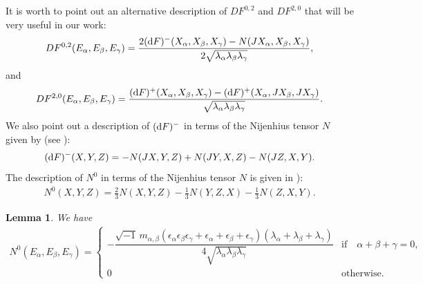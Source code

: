 \documentclass[10pt,a4paper]{amsart}
\numberwithin{equation}{section}
\newtheorem{Lemma}[Theorem]{Lemma}
\begin{document}
\begin{Remark}
It is worth to point out an alternative description of $DF^{0,2}$ and $DF^{2,0}$ that will be very useful in our work:
\begin{gather*}
DF^{0,2}(E_{\alpha},E_{\beta},E_{\gamma})=\dfrac{2({\rm d}F)^{-}(X_{\alpha},X_{\beta},X_{\gamma}) -N(JX_{\alpha},X_{\beta},X_{\gamma})}{2\sqrt{\lambda_{\alpha}\lambda_{\beta}\lambda_{\gamma}}},
\end{gather*}
and
\begin{gather*}
DF^{2,0}(E_{\alpha},E_{\beta},E_{\gamma})=\dfrac{({\rm d}F)^{+}(X_{\alpha},X_{\beta},X_{\gamma})-({\rm d}F)^{+}(X_{\alpha},JX_{\beta},JX_{\gamma})}{\sqrt{\lambda_{\alpha}\lambda_{\beta}\lambda_{\gamma}}}.
\end{gather*}
We also point out a description of $({\rm d}F)^-$ in terms of the Nijenhius tensor $N$ given by (see \cite{gau}):
\begin{gather*}
({\rm d}F)^{-}(X,Y,Z)=-N(JX,Y,Z)+N(JY,X,Z)-N(JZ,X,Y).
\end{gather*}
The description of $N^0$ in terms of the Nijenhius tensor $N$ is given in \cite{gau}):
\begin{gather*}
N^{0}(X,Y,Z)=\frac{2}{3}N(X,Y,Z)-\frac{1}{3}N(Y,Z,X)-\frac{1}{3}N(Z,X,Y).
\end{gather*}
\end{Remark}

\begin{Lemma}
We have
\begin{gather*}
N^{0}(E_{\alpha},E_{\beta},E_{\gamma})=\begin{cases}
-\dfrac{\sqrt{-1} \, m_{\alpha,\beta} (\epsilon_{\alpha}\epsilon_{\beta}\epsilon_{\gamma} \!+\epsilon_{\alpha}\!+\epsilon_{\beta}\!+\epsilon_{\gamma}) (\lambda_{\alpha}\!+\lambda_{\beta}\!+\lambda_{\gamma})}{4 \sqrt{\lambda_{\alpha}\lambda_{\beta}\lambda_{\gamma}}}  & \text{if}\quad \alpha\!+\beta\!+\gamma = 0,
\\
0 & \text{otherwise}.
\end{cases}
\end{gather*}
\end{Lemma}
\end{document}
